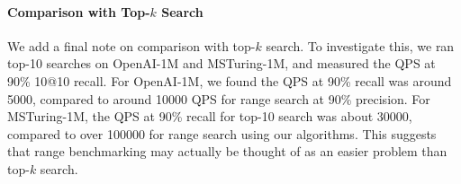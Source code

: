 \paragraph{Comparison with Top-$k$ Search} We add a final note on comparison with top-$k$ search. To investigate this, we ran top-10 searches on OpenAI-1M and MSTuring-1M, and measured the QPS at 90\% 10@10 recall. For OpenAI-1M, we found the QPS at 90\% recall was around 5000, compared to around 10000 QPS for range search at 90\% precision. For MSTuring-1M, the QPS at 90\% recall for top-10 search was about 30000, compared to over 100000 for range search using our algorithms. This suggests that range benchmarking may actually be thought of as an easier problem than top-$k$ search.






